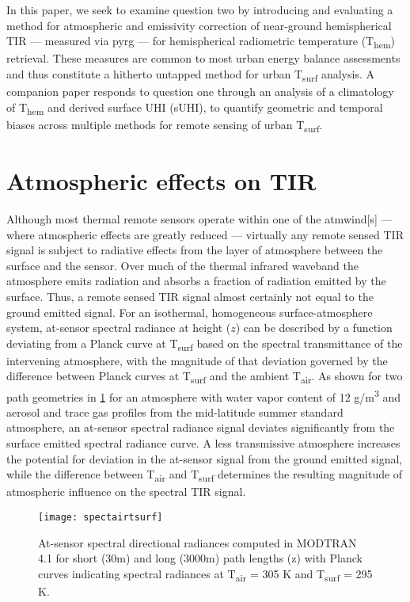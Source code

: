 \noindent In this paper, we seek to examine question two by introducing and evaluating a method for atmospheric and emissivity correction of near-ground hemispherical TIR --- measured via \gls{pyrg} --- for hemispherical radiometric temperature (T\textsubscript{hem}) retrieval. These measures are common to most urban energy balance assessments and thus constitute a hitherto untapped method for urban T\textsubscript{surf} analysis. A companion paper responds to question one through an analysis of a climatology of T\textsubscript{hem} and derived surface UHI (sUHI), to quantify geometric and temporal biases across multiple methods for remote sensing of urban T\textsubscript{surf}.

\section{Atmospheric effects on TIR}

Although most thermal remote sensors operate within one of the \gls{atmwind}[s] --- where atmospheric effects are greatly reduced --- virtually any remote sensed TIR signal is subject to radiative effects from the layer of atmosphere between the surface and the sensor. Over much of the thermal infrared \gls{waveband} the atmosphere emits radiation and absorbs a fraction of radiation emitted by the surface. Thus, a remote sensed TIR signal almost certainly not equal to the ground emitted signal. For an isothermal, homogeneous surface-atmosphere system, at-sensor spectral radiance at height ($z$) can be described by a function deviating from a Planck curve at T\textsubscript{surf} based on the spectral transmittance of the intervening atmosphere, with the magnitude of that deviation governed by the difference between Planck curves at T\textsubscript{surf} and the ambient T\textsubscript{air}. As shown for two path geometries in \ref{spectairtsurf} for an atmosphere with water vapor content of  12 g/m\textsuperscript{3} and aerosol and trace gas profiles from the mid-latitude summer standard atmosphere, an at-sensor spectral radiance signal deviates significantly from the surface emitted spectral radiance curve. A less transmissive atmosphere increases the potential for deviation in the at-sensor signal from the ground emitted signal, while the difference between T\textsubscript{air} and T\textsubscript{surf} determines the resulting magnitude of atmospheric influence on the spectral TIR signal.

\begin{figure}[!ht]
	\texttt{[image: spectairtsurf]}
	\caption{At-sensor spectral directional radiances computed in MODTRAN 4.1 \cite{Berk1987} for short (30m) and long (3000m) path lengths (z) with Planck curves indicating spectral radiances at T\textsubscript{air} = 305 K and T\textsubscript{surf} = 295 K.}
	\label{spectairtsurf}
\end{figure}

